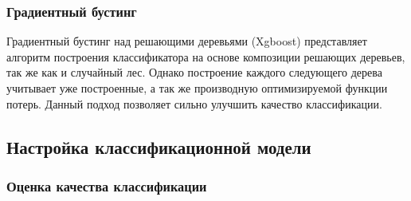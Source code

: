 \documentclass[14pt]{extarticle}
\begin{document}
\subsubsection{Градиентный бустинг}

\par
Градиентный бустинг над решающими деревьями (Xgboost) 
\cite{xgboost} представляет алгоритм построения
классификатора на основе композиции решающих деревьев, так же как и случайный лес. 
Однако построение каждого следующего дерева учитывает уже построенные, а так же производную
оптимизируемой функции потерь. Данный подход позволяет сильно улучшить качество классификации.

\subsection{Настройка классификационной модели}

\subsubsection{Оценка качества классификации}
\end{document}
